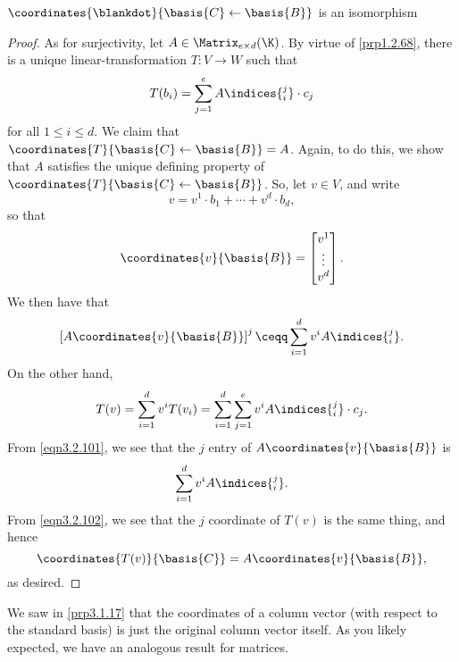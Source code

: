 \begin{prp}{$\coordinates{\blankdot}{\basis{C}\leftarrow \basis{B}}$ is an isomorphism}{}
\begin{proof}
		As for surjectivity, let $A\in \Matrix _{e\times d}(\K )$.  By virtue of \cref{prp1.2.68}, there is a unique linear-transformation $T\colon V\rightarrow W$ such that
		\begin{equation}
			T(b_i)=\sum _{j=1}^eA\indices{^j_i}\cdot c_j
		\end{equation}
		for all $1\leq i\leq d$.  We claim that $\coordinates{T}{\basis{C}\leftarrow \basis{B}}=A$.  Again, to do this, we show that $A$ satisfies the unique defining property of $\coordinates{T}{\basis{C}\leftarrow \basis{B}}$.  So, let $v\in V$, and write
		\begin{equation}
			v=v^1\cdot b_1+\cdots +v^d\cdot b_d,
		\end{equation}
		so that
		\begin{equation}
			\coordinates{v}{\basis{B}}=\begin{bmatrix}v^1 \\ \vdots \\ v^d\end{bmatrix}.
		\end{equation}
		We then have that
		\begin{equation}\label{eqn3.2.101}
			\left[ A\coordinates{v}{\basis{B}}\right] ^j\ceqq \sum _{i=1}^dv^iA\indices{^j_i}.
		\end{equation}
		On the other hand,
		\begin{equation}\label{eqn3.2.102}
			T(v)=\sum _{i=1}^dv^iT(v_i)=\sum _{i=1}^d\sum _{j=1}^ev^iA\indices{^j_i}\cdot c_j.
		\end{equation}
		From \eqref{eqn3.2.101}, we see that the $j$ entry of $A\coordinates{v}{\basis{B}}$ is
		\begin{equation}
			\sum _{i=1}^dv^iA\indices{^j_i}.
		\end{equation}
		From \eqref{eqn3.2.102}, we see that the $j$ coordinate of $T(v)$ is the same thing, and hence
		\begin{equation}
			\coordinates{T(v)}{\basis{C}}=A\coordinates{v}{\basis{B}},
		\end{equation}
		as desired.
	\end{proof}
\end{prp}
We saw in \cref{prp3.1.17} that the coordinates of a column vector (with respect to the standard basis) is just the original column vector itself.  As you likely expected, we have an analogous result for matrices.
